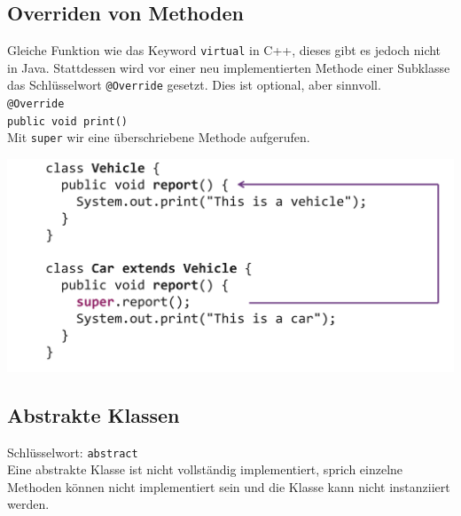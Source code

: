 \subsection{Overriden von Methoden}
Gleiche Funktion wie das Keyword \verb|virtual| in C++, dieses gibt es jedoch nicht in Java. Stattdessen wird
vor einer neu implementierten Methode einer Subklasse das Schlüsselwort \verb|@Override| gesetzt. Dies ist optional, aber sinnvoll.\\
\verb|@Override|\\
\verb|public void print()|\\

Mit \verb|super| wir eine überschriebene Methode aufgerufen.
\begin{center}
    \includegraphics[width=0.9\columnwidth]{pictures/super.png}
\end{center}

\subsection{Abstrakte Klassen}{\label{AbstractClass}}
Schlüsselwort: \verb|abstract|\\

Eine abstrakte Klasse ist nicht vollständig implementiert, sprich einzelne Methoden können nicht implementiert 
sein und die Klasse kann nicht instanziiert werden.


